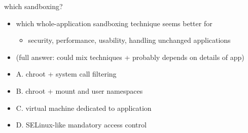 \begin{frame}{which sandboxing?}
    \begin{itemize}
    \item which whole-application sandboxing technique seems better for 
        \begin{itemize}
        \item security, performance, usability, handling unchanged applications
        \end{itemize}
    \item (full answer: could mix techniques + probably depends on details of app)
    \vspace{.5cm}
    \item A. chroot + system call filtering
    \item B. chroot + mount and user namespaces
    \item C. virtual machine dedicated to application
    \item D. SELinux-like mandatory access control
    \end{itemize}
\end{frame}
